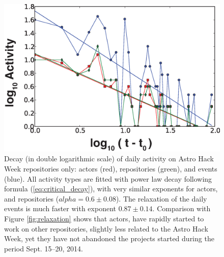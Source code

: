 


\begin{figure}[!t]
\centering
\includegraphics[width=0.9\columnwidth]{figures/relaxation_aw_repos.eps}
\caption{Decay (in double logarithmic scale) of daily activity on Astro Hack Week repositories only: actors (red), repositories (green), and events (blue). All activity types are fitted with power law decay following formula (\ref{eq:critical_decay}), with very similar exponents for actors, and repositories ($alpha = 0.6\pm0.08$). The relaxation of the daily events is much faster with exponent $0.87\pm0.14$. Comparison with Figure \ref{fig:relaxation} shows that actors, have rapidly started to work on other repositories, slightly less related to the Astro Hack Week, yet they have not abandoned the projects started during the period Sept. 15--20, 2014.}
\label{fig:decay_astro_repos}
\end{figure}

